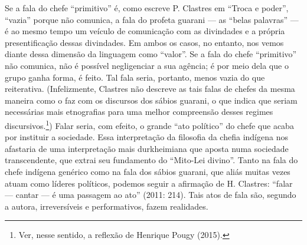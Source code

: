\documentclass{article}
\begin{document}
Se a fala do chefe {\textquotedblleft}primitivo{\textquotedblright} \'e,
como escreve P. Clastres em {\textquotedblleft}Troca e
poder{\textquotedblright}, {\textquotedblleft}vazia{\textquotedblright}
porque n\~ao comunica, a fala do profeta guarani --- as
{\textquotedblleft}belas palavras{\textquotedblright} --- \'e ao mesmo
tempo um ve\'iculo de comunica\c{c}\~ao com as divindades e a pr\'opria
presentifica\c{c}\~ao dessas divindades. Em ambos os casos, no entanto,
nos vemos diante dessa dimens\~ao da linguagem como
{\textquotedblleft}valor{\textquotedblright}. Se a fala do chefe
{\textquotedblleft}primitivo{\textquotedblright} n\~ao comunica, n\~ao
\'e poss\'ivel negligenciar a sua ag\^encia; \'e por meio dela que o
grupo ganha forma, \'e feito. Tal fala seria, portanto, menos vazia do
que reiterativa. (Infelizmente, Clastres n\~ao descreve as tais falas
de chefes da mesma maneira como o faz com os discursos dos s\'abios
guarani, o que indica que seriam necess\'arias mais etnografias para
uma melhor compreens\~ao desses regimes discursivos.\footnote{ Ver,
nesse sentido, a reflex\~ao de Henrique Pougy (2015).}) Falar seria,
com efeito, o grande {\textquotedblleft}ato
pol\'itico{\textquotedblright} do chefe que acaba por instituir a
sociedade. Essa interpreta\c{c}\~ao da filosofia da chefia ind\'igena
nos afastaria de uma interpreta\c{c}\~ao mais durkheimiana que aposta
numa sociedade transcendente, que extrai seu fundamento do
{\textquotedblleft}Mito-Lei divino{\textquotedblright}. Tanto na fala
do chefe ind\'igena gen\'erico como na fala dos s\'abios guarani, que
ali\'as muitas vezes atuam como l\'ideres pol\'iticos, podemos seguir a
afirma\c{c}\~ao de H. Clastres: {\textquotedblleft}falar --- cantar ---
\'e uma passagem ao ato{\textquotedblright} (2011: 214). Tais atos de
fala s\~ao, segundo a autora, irrevers\'iveis e performativos, fazem
realidades. 
\end{document}
